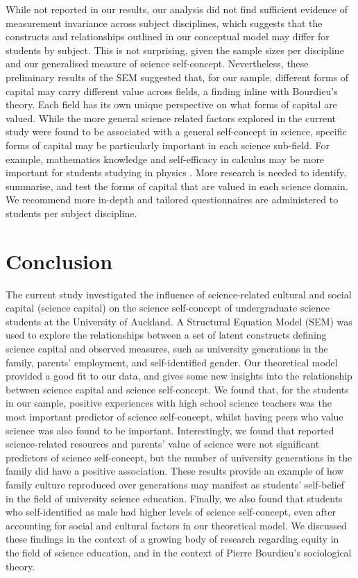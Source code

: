 While not reported in our results, our analysis did not find sufficient evidence of measurement invariance across subject disciplines, which suggests that the constructs and relationships outlined in our conceptual model may differ for students by subject. This is not surprising, given the sample sizes per discipline and our generalised measure of science self-concept. Nevertheless, these preliminary results of the SEM suggested that, for our sample, different forms of capital may carry different value across fields, a finding inline with Bourdieu's theory. Each field has its own unique perspective on what forms of capital are valued. While the more general science related factors explored in the current study were found to be associated with a general self-concept in science, specific forms of capital may be particularly important in each science sub-field. For example, mathematics knowledge and self-efficacy in calculus may be more important for students studying in physics \citep{Black2016,Ellis_2016}. More research is needed to identify, summarise, and test the forms of capital that are valued in each science domain. We recommend more in-depth and tailored questionnaires are administered to students per subject discipline.  

\section{Conclusion}
The current study investigated the influence of science-related cultural and social capital (science capital) on the science self-concept of undergraduate science students at the University of Auckland. A Structural Equation Model (SEM) was used to explore the relationships between a set of latent constructs defining science capital and observed measures, such as university generations in the family, parents' employment, and self-identified gender. Our theoretical model provided a good fit to our data, and gives some new insights into the relationship between science capital and science self-concept. We found that, for the students in our sample, positive experiences with high school science teachers was the most important predictor of science self-concept, whilst having peers who value science was also found to be important. Interestingly, we found that reported science-related resources and parents' value of science were not significant predictors of science self-concept, but the number of university generations in the family did have a positive association. These results provide an example of how family culture reproduced over generations may manifest as students' self-belief in the field of university science education. Finally, we also found that students who self-identified as male had higher levels of science self-concept, even after accounting for social and cultural factors in our theoretical model. We discussed these findings in the context of a growing body of research regarding equity in the field of science education, and in the context of Pierre Bourdieu's sociological theory.  


